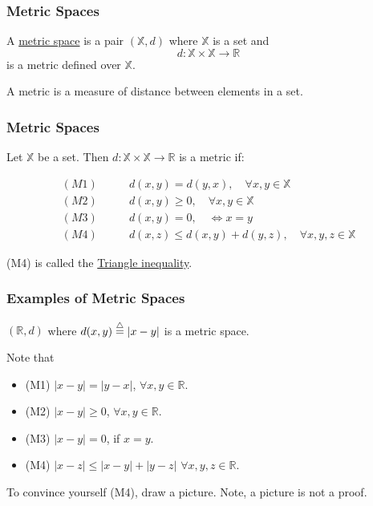 \documentclass{beamer}
\begin{document}
\begin{frame}\frametitle{Metric Spaces}

\begin{definition} A \underline{metric space} is a pair $(\mathbb{X},d)$ where $\mathbb{X}$ is a set and 
	\[
	d:\mathbb{X} \times \mathbb{X} \to \mathbb{R}
	\]
	is a metric defined over $\mathbb{X}$.\\
\end{definition}
	
A metric is a measure of distance between elements in a set.
\end{frame}

\begin{frame}\frametitle{Metric Spaces}
\begin{definition}[Metric]
Let $\mathbb{X}$ be a set.  Then 
$d:\mathbb{X} \times \mathbb{X} \to \mathbb{R}$ is a metric if:

\begin{align*} 
(M1) \qquad & d(x,y) = d(y,x), \quad \forall x,y \in \mathbb{X} \\
(M2) \qquad & d(x,y) \geq 0, \quad \forall x,y \in \mathbb{X} \\
(M3) \qquad & d(x,y) = 0, \quad \iff x = y\\
(M4) \qquad &d(x,z) \leq d(x,y) + d(y,z), \quad \forall x,y,z \in \mathbb{X}
\end{align*}
\end{definition}

(M4) is called the \underline{Triangle inequality}.
\end{frame}

\begin{frame}\frametitle{Examples of Metric Spaces}

\begin{example}[E1]

$(\mathbb{R}, d)$ where $d(x,y) \stackrel{\triangle}{=} |x-y|$ is a metric space.

Note that 
\begin{itemize}
	\item (M1) $|x-y| = |y-x|$, $\forall x,y \in \mathbb{R}$.
	\item (M2) $|x-y|\geq 0$, $\forall x,y \in \mathbb{R}$.	
	\item (M3) $|x-y| = 0$, if $x=y$.	
	\item (M4) $|x-z|\leq |x-y| + |y-z|$ $\forall x,y,z \in \mathbb{R}$. 
\end{itemize}
\end{example}

To convince yourself (M4), draw a picture.  Note, a picture is not a proof.

\end{frame}
\end{document}
